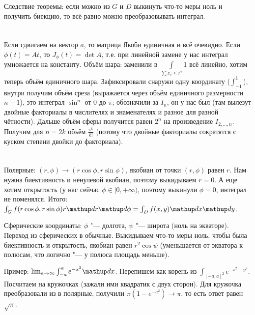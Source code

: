 Следствие теоремы: если можно из $G$ и $D$ выкинуть что-то меры ноль и получить биекцию, то всё равно можно преобразовывать интеграл.

\section{} %
Если сдвигаем на вектор $a$, то матрица Якоби единичная и всё очевидно.
Если $\phi(t) = At$, то $J_\phi(t) = \det A$, т.е. при линейной замене у нас интеграл умножается на константу.
Объём шара: заменили в $\int\limits_{\sum x_i \le r^2} 1$ всё линейно, хотим теперь объём единичного шара.
Зафиксировали снаружи одну координату ($\int_{-1}^1$), внутри получим объём среза (выражается через объём единичного размерности $n-1$),
это интеграл $\sin^n$ от $0$ до $\pi$; обозначили за $I_n$, он у нас был (там вылезут двойные факториалы в числителях и знаменателях и разное для разной чётности).
Дальше объём сферы получится равен $2^n$ на произведение $I_{2,\dots,n}$.
Получим для $n=2k$ объём $\frac{\pi^k}{k!}$ (потому что двойные факториалы сократятся с куском степени двойки до факториала).

\section{} %
Полярные: $(r, \phi) \to (r\cos\phi, r\sin\phi)$, якобиан от точки $(r, \phi)$ равен $r$.
Нам нужна биективность и ненулевой якобиан, поэтому выкидываем $r=0$.
А еще хотим открытость (у нас сейчас $\phi \in [0, +\infty)$, поэтому выкинули $\phi=0$, интеграл не поменялся.
Итого: $\int_G f(r\cos\phi, r\sin\phi)r \d r \d \phi = \int_D f(x, y) \d x \d y$.

Сферические координаты: $\phi$ "--- долгота, $\psi$ "--- широта (ноль на экваторе).
Переход из сферических в обычные.
Выкидываем что-то меры ноль, чтобы была биективность и открытость, якобиан равен $r^2 \cos \psi$ (уменьшается от экватора к полюсам, что логично "--- у полюса площадь меньше).

Пример: $\lim_{a\to\infty} \int_{-a}^a e^{-x^2} \d x$.
Перепишем как корень из $\int_{[-a,a]^2} e^{-x^2-y^2}$.
Посчитаем на кружочках (зажали ими квадратик с двух сторон).
Для кружочка преобразовали из в полярные, получили $\pi(1-e^{-a^2}) \to \pi$, то есть ответ равен $\sqrt \pi$.

